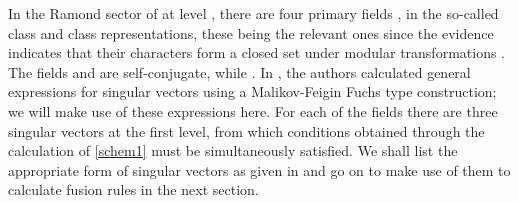 \documentclass[a4paper,12pt]{article}
\def\hslck       {\hat{sl}(2|1;{\mathbb C})_k}
\begin{document}
In the Ramond sector of \myHighlight{$\hslck$}\coordHE{} at level \coordHE{}, there are four
primary fields \coordHE{}, \coordHE{} in the
so-called class \coordHE{} and class \coordHE{} representations, these being the
relevant ones since the evidence indicates that their characters form
a closed set under modular transformations \cite{GBJ}.  The fields 
\coordHE{} and \coordHE{} are self-conjugate, while 
\coordHE{}.  In
\cite{BT97}, the authors calculated general expressions for singular
vectors using a Malikov-Feigin Fuchs type construction; we will make use of
these expressions here.  For each of the fields \coordHE{} there are three
singular vectors at the first level, from which conditions obtained through
the calculation of \eqref{schem1} must be simultaneously satisfied.  We shall
list the appropriate form of singular vectors as given in \cite{BT97} and go
on to make use of them to calculate fusion rules in the next section. 
\end{document}
